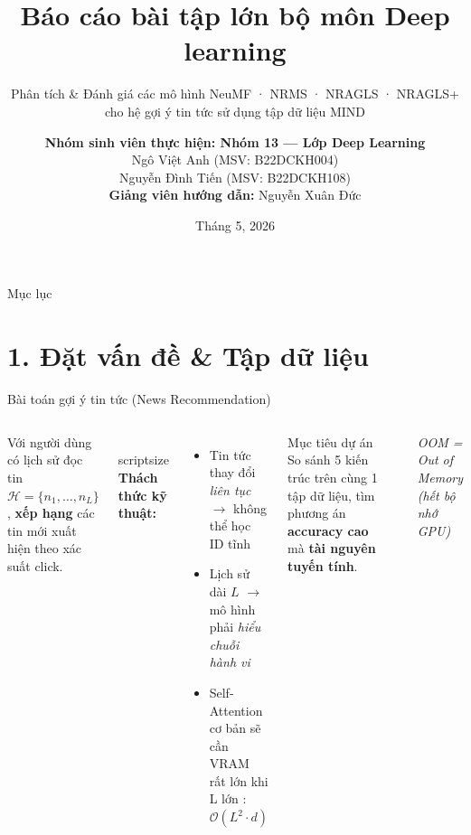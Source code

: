\documentclass[aspectratio=169,11pt]{beamer}
\title[Báo cáo bài tập lớn Deep learning]{Báo cáo bài tập lớn bộ môn Deep learning}
\subtitle{Phân tích \& Đánh giá các mô hình NeuMF · NRMS · NRAGLS · NRAGLS+ \\ cho hệ gợi ý tin tức sử dụng tập dữ liệu MIND}
\author[Nhóm 13 - DL]{%
  \textbf{Nhóm sinh viên thực hiện: Nhóm 13 --- Lớp Deep Learning}\\[0.8em]
  Ngô Việt Anh \hfill (MSV: B22DCKH004)\\[0.3em]
  Nguyễn Đình Tiến \hfill (MSV: B22DCKH108)\\[1.2em]
  \textbf{Giảng viên hướng dẫn:} Nguyễn Xuân Đức}
\institute[PTIT]{Khoa CNTT1 --- Học viện Công nghệ Bưu chính Viễn thông (PTIT)}
\date{Tháng 5, 2026}
\newcommand{\faQuestionCircle}{{\color{ptitmid}\textbf{?}}}
\begin{document}
\begin{frame}
  \titlepage
\end{frame}

\begin{frame}{Mục lục}
  \tableofcontents
\end{frame}

\section{1. Đặt vấn đề \& Tập dữ liệu}

\begin{frame}{Bài toán gợi ý tin tức (News Recommendation)}
  \begin{columns}[T]
      \begin{keybox}[title={\faQuestionCircle\ Bài toán}]
        Với người dùng có lịch sử đọc tin $\mathcal{H}=\{n_1,\dots,n_L\}$,
        \textbf{xếp hạng} các tin mới xuất hiện theo xác suất click.
      \end{keybox}
      \\scriptsize
      \textbf{Thách thức kỹ thuật:}
      \begin{itemize}
        \item Tin tức thay đổi \textit{liên tục} $\to$ không thể học ID tĩnh
        \item Lịch sử dài $L$ $\to$ mô hình phải \textit{hiểu chuỗi hành vi}
        \item Self-Attention cơ bản sẽ cần VRAM rất lớn khi L lớn : $\mathcal{O}(L^2 \cdot d)$
      \end{itemize}

\begin{block}{Mục tiêu dự án}
        So sánh 5 kiến trúc trên cùng 1 tập dữ liệu,
        tìm phương án \textbf{accuracy cao} mà \textbf{tài nguyên tuyến tính}.
      \end{block}

      \begin{center}
      \end{center}
      \vspace{0.3em}
      {\footnotesize \textit{OOM = Out of Memory (hết bộ nhớ GPU)}}
  \end{columns}
\end{frame}
\end{document}
